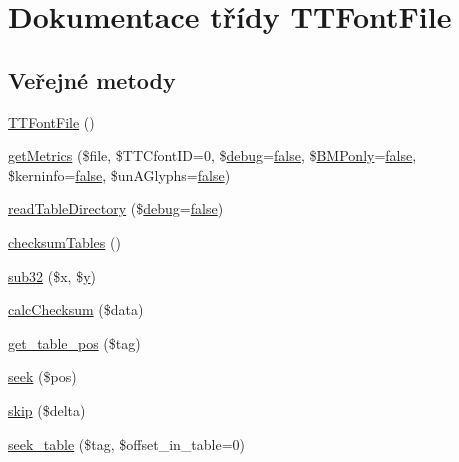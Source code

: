 \hypertarget{class_t_t_font_file}{\section{Dokumentace třídy T\-T\-Font\-File}
\label{class_t_t_font_file}
}
\subsection*{Veřejné metody}
\begin{DoxyCompactItemize}
\item 
\hyperlink{class_t_t_font_file_a25304a923113b3620c623b0d0f8cb323}{T\-T\-Font\-File} ()
\item 
\hyperlink{class_t_t_font_file_ab7c6feb1e9321abe10a6cc3f4cd2df13}{get\-Metrics} (\$file, \$T\-T\-Cfont\-I\-D=0, \$\hyperlink{font__dump_8php_a200a436f1833a712239f1ae5bec608db}{debug}=\hyperlink{ttfontsuni_8php_afbaa04e5cc97693dc668b3c45d3dd740}{false}, \$\hyperlink{config__fonts_8php_a4cae730e8755c0dac19a7b97d9cdff30}{B\-M\-Ponly}=\hyperlink{ttfontsuni_8php_afbaa04e5cc97693dc668b3c45d3dd740}{false}, \$kerninfo=\hyperlink{ttfontsuni_8php_afbaa04e5cc97693dc668b3c45d3dd740}{false}, \$un\-A\-Glyphs=\hyperlink{ttfontsuni_8php_afbaa04e5cc97693dc668b3c45d3dd740}{false})
\item 
\hyperlink{class_t_t_font_file_a5719baf02f7c4fddfa74645f50045f91}{read\-Table\-Directory} (\$\hyperlink{font__dump_8php_a200a436f1833a712239f1ae5bec608db}{debug}=\hyperlink{ttfontsuni_8php_afbaa04e5cc97693dc668b3c45d3dd740}{false})
\item 
\hyperlink{class_t_t_font_file_a027d60144855861ecc1e6a6631fe8f3f}{checksum\-Tables} ()
\item 
\hyperlink{class_t_t_font_file_a1d22d6f36a84dc14507dbb8783450f15}{sub32} (\$x, \$\hyperlink{example43___m_p_d_f_i__booklet_8php_a3f83be162d14f38451e1bc419fbbbcbc}{y})
\item 
\hyperlink{class_t_t_font_file_a2efdfa88658f77e592be597384803aa0}{calc\-Checksum} (\$data)
\item 
\hyperlink{class_t_t_font_file_aa55df1d69663b2e5584eb5409b67a884}{get\-\_\-table\-\_\-pos} (\$tag)
\item 
\hyperlink{class_t_t_font_file_a9e730653ab121144a674df4a5ee82785}{seek} (\$pos)
\item 
\hyperlink{class_t_t_font_file_abafdbd1f26f2454888a1185101b2db2e}{skip} (\$delta)
\item 
\hyperlink{class_t_t_font_file_ad119d39345aeff1f53a3371bca410908}{seek\-\_\-table} (\$tag, \$offset\-\_\-in\-\_\-table=0)

\end{DoxyCompactItemize}
